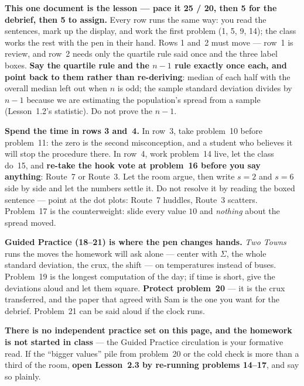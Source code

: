 \documentclass[10pt]{article}
\begin{document}
\begin{teachernote}
\textbf{This one document is the lesson --- pace it 25 / 20, then 5 for the debrief, then 5 to
assign.} Every row runs the same way: you read the sentences, mark up the display, and work the
first problem (1, 5, 9, 14); the class works the rest with the pen in their hand. Rows 1 and~2
must move --- row~1 is review, and row~2 needs only the quartile rule said once and the three
label boxes. \textbf{Say the quartile rule and the $n - 1$ rule exactly once each, and point
back to them rather than re-deriving}: median of each half with the overall median left out when
$n$ is odd; the sample standard deviation divides by $n - 1$ because we are estimating the
population's spread from a sample (Lesson~1.2's statistic). Do not prove the $n - 1$.

\textbf{Spend the time in rows 3 and~4.} In row~3, take problem~10 before problem~11: the zero
is the second misconception, and a student who believes it will stop the procedure there. In
row~4, work problem~14 live, let the class do~15, and \textbf{re-take the hook vote at
problem~16 before you say anything}: Route~7 or Route~3. Let the room argue, then write $s = 2$
and $s = 6$ side by side and let the numbers settle it. Do not resolve it by reading the boxed
sentence --- point at the dot plots: Route~7 huddles, Route~3 scatters. Problem~17 is the
counterweight: slide every value $10$ and \emph{nothing} about the spread moved.

\textbf{Guided Practice (18--21) is where the pen changes hands.} \emph{Two Towns} runs the moves
the homework will ask alone --- center with $\Sigma$, the whole standard deviation, the crux, the
shift --- on temperatures instead of buses. Problem~19 is the longest computation of the day; if
time is short, give the deviations aloud and let them square. \textbf{Protect problem~20} --- it
is the crux transferred, and the paper that agreed with Sam is the one you want for the debrief.
Problem~21 can be said aloud if the clock runs.

\textbf{There is no independent practice set on this page, and the homework is not started in
class} --- the Guided Practice circulation is your formative read. If the ``bigger values'' pile
from problem~20 or the cold check is more than a third of the room, \textbf{open Lesson~2.3 by
re-running problems 14--17}, and say so plainly.
\end{teachernote}
\end{document}
